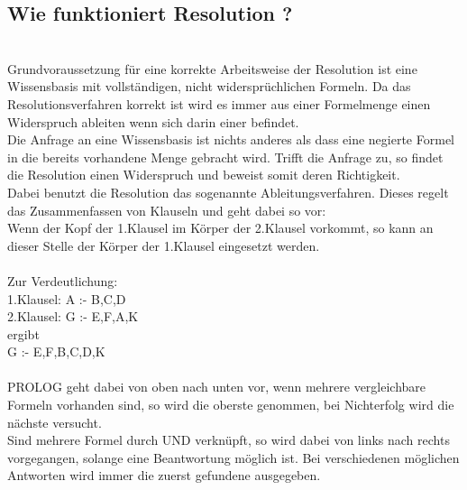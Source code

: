 \subsection{Wie funktioniert Resolution ?}\qquad\\
Grundvoraussetzung für eine korrekte Arbeitsweise der Resolution ist eine Wissensbasis mit vollständigen, nicht widersprüchlichen Formeln. Da das Resolutionsverfahren korrekt ist wird es immer aus einer Formelmenge einen Widerspruch ableiten wenn sich darin einer befindet.\\
Die Anfrage an eine Wissensbasis ist nichts anderes als dass eine negierte Formel in die bereits vorhandene Menge gebracht wird. Trifft die Anfrage zu, so findet die Resolution einen Widerspruch und beweist somit deren Richtigkeit.\\
Dabei benutzt die Resolution das sogenannte Ableitungsverfahren. Dieses regelt das Zusammenfassen von Klauseln und geht dabei so vor:\\
Wenn der Kopf der 1.Klausel im Körper der 2.Klausel vorkommt, so kann an dieser Stelle der Körper der 1.Klausel eingesetzt werden.\\
\qquad\\
Zur Verdeutlichung:\\
1.Klausel: A :- B,C,D\\
2.Klausel: G :- E,F,A,K\\
ergibt\\
G :- E,F,B,C,D,K\\
\qquad\\
PROLOG geht dabei von oben nach unten vor, wenn mehrere vergleichbare Formeln vorhanden sind, so wird die \grqq oberste\grqq{} genommen, bei Nichterfolg wird die nächste versucht.\\
Sind mehrere Formel durch UND verknüpft, so wird dabei von links nach rechts vorgegangen, solange eine Beantwortung möglich ist. Bei verschiedenen möglichen Antworten wird immer die zuerst gefundene ausgegeben.
\newpage

